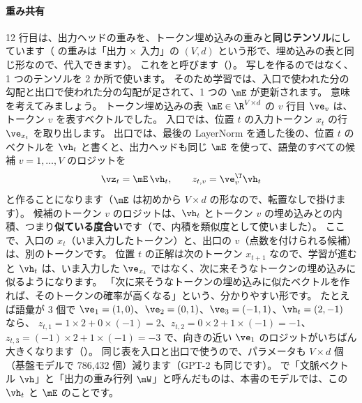 \paragraph{重み共有} 12 行目は、出力ヘッドの重みを、トークン埋め込みの重みと\textbf{同じテンソル}にしています（ の重みは「出力 × 入力」の $(V,d)$ という形で、埋め込みの表と同じ形なので、代入できます）。
これを\cite{press2017using}と呼びます（）。
写しを作るのではなく、1 つのテンソルを 2 か所で使います。
そのため学習では、入口で使われた分の勾配と出口で使われた分の勾配が足されて、1 つの $\mE$ が更新されます。
意味を考えてみましょう。
トークン埋め込みの表 $\mE\in\R^{V\times d}$ の $v$ 行目 $\ve_v$ は、トークン $v$ を表すベクトルでした。
入口では、位置 $t$ の入力トークン $x_t$ の行 $\ve_{x_t}$ を取り出します。
出口では、最後の LayerNorm を通した後の、位置 $t$ のベクトルを $\vh_t$ と書くと、出力ヘッドも同じ $\mE$ を使って、語彙のすべての候補 $v=1,\dots,V$ のロジットを
\begin{equation}
\vz_t = \mE\,\vh_t,\qquad z_{t,v} = \ve_v^\T\vh_t
\label{eq:tf-tying}
\end{equation}
と作ることになります（$\mE$ は初めから $V\times d$ の形なので、転置なしで掛けます）。
候補のトークン $v$ のロジットは、$\vh_t$ とトークン $v$ の埋め込みとの内積、つまり\textbf{似ている度合い}です（で、内積を類似度として使いました）。
ここで、入口の $x_t$（いま入力したトークン）と、出口の $v$（点数を付けられる候補）は、別のトークンです。
位置 $t$ の正解は次のトークン $x_{t+1}$ なので、学習が進むと $\vh_t$ は、いま入力した $\ve_{x_t}$ ではなく、次に来そうなトークンの埋め込みに似るようになります。
「次に来そうなトークンの埋め込みに似たベクトルを作れば、そのトークンの確率が高くなる」という、分かりやすい形です。
たとえば語彙が 3 個で $\ve_1=(1,0)$、$\ve_2=(0,1)$、$\ve_3=(-1,1)$、$\vh_t=(2,-1)$ なら、
$z_{t,1}=1\times2+0\times(-1)=2$、$z_{t,2}=0\times2+1\times(-1)=-1$、$z_{t,3}=(-1)\times2+1\times(-1)=-3$ で、向きの近い $\ve_1$ のロジットがいちばん大きくなります（）。
同じ表を入口と出口で使うので、パラメータも $V\times d$ 個（基盤モデルで 786,432 個）減ります（GPT-2 も同じです）。
で「文脈ベクトル $\vh$」と「出力の重み行列 $\mW$」と呼んだものは、本書のモデルでは、この $\vh_t$ と $\mE$ のことです。


